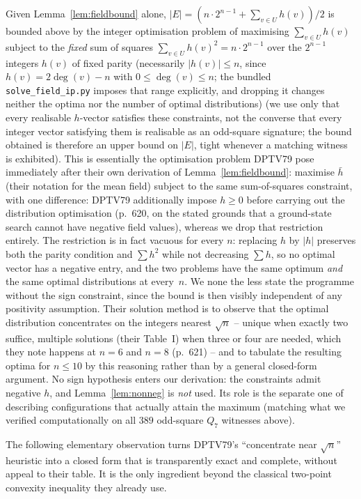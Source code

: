 \documentclass[12pt,a4paper]{article}
\theoremstyle{definition}
\begin{document}
Given Lemma~\ref{lem:fieldbound} alone, $|E|=(n\cdot2^{n-1}+\sum_{v\in U}h(v))/2$
is bounded above by the integer optimisation problem of
maximising $\sum_{v\in U}h(v)$ subject to the \emph{fixed}
sum of squares $\sum_{v\in U}h(v)^2=n\cdot2^{n-1}$ over the $2^{n-1}$
integers $h(v)$ of fixed parity (necessarily $|h(v)|\le n$, since
$h(v)=2\deg(v)-n$ with $0\le\deg(v)\le n$; the bundled
\texttt{solve\_field\_ip.py} imposes that range explicitly, and dropping it
changes neither the optima nor the number of optimal distributions) (we use only that every
realisable $h$-vector satisfies these constraints, not the converse
that every integer vector satisfying them is realisable as an
odd-square signature; the bound obtained is therefore an upper bound on
$|E|$, tight whenever a matching witness is exhibited). This is
essentially the optimisation problem DPTV79 pose immediately after their
own derivation of Lemma~\ref{lem:fieldbound}: maximise $\bar h$ (their
notation for the mean field) subject to the same sum-of-squares
constraint, with one difference: DPTV79 additionally impose $h\ge0$ before
carrying out the distribution optimisation (p.~620, on the stated grounds
that a ground-state search cannot have negative field values), whereas we
drop that restriction entirely. The restriction is in fact vacuous for every $n$:
replacing $h$ by $|h|$ preserves both the parity condition and
$\sum h^2$ while not decreasing $\sum h$, so no optimal vector has a
negative entry, and the two problems have the same optimum \emph{and} the
same optimal distributions at every~$n$. We none the less state the
programme without the sign constraint, since the bound is then visibly
independent of any positivity assumption. Their
solution method is to observe that the optimal
distribution concentrates on the integers nearest $\sqrt n$ -- unique
when exactly two suffice, multiple solutions (their Table~I) when three
or four are needed, which they note happens at $n=6$ and $n=8$ (p.~621) -- and
to tabulate the resulting optima for $n\le10$ by this reasoning rather
than by a general closed-form argument. No sign
hypothesis enters our derivation: the constraints admit negative $h$, and
Lemma~\ref{lem:nonneg} is \emph{not} used. Its role
is the separate one of describing configurations that actually attain
the maximum (matching what we verified computationally on all $389$
odd-square $Q_7$ witnesses above).

The following elementary observation turns DPTV79's ``concentrate near
$\sqrt n$'' heuristic into a closed form that is transparently exact and
complete, without appeal to their table. It is the only ingredient
beyond the classical two-point convexity inequality they already use.
\end{document}
